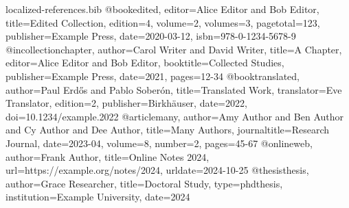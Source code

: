 \begin{filecontents*}{localized-references.bib}
@book{edited,
  editor={Alice Editor and Bob Editor}, title={Edited Collection},
  edition={4}, volume={2}, volumes={3}, pagetotal={123},
  publisher={Example Press}, date={2020-03-12}, isbn={978-0-1234-5678-9}}
@incollection{chapter,
  author={Carol Writer and David Writer}, title={A Chapter},
  editor={Alice Editor and Bob Editor}, booktitle={Collected Studies},
  publisher={Example Press}, date={2021}, pages={12-34}}
@book{translated,
  author={Paul Erd{\H{o}}s and Pablo Soberón}, title={Translated Work},
  translator={Eve Translator}, edition={2}, publisher={Birkhäuser}, date={2022},
  doi={10.1234/example.2022}}
@article{many,
  author={Amy Author and Ben Author and Cy Author and Dee Author},
  title={Many Authors}, journaltitle={Research Journal},
  date={2023-04}, volume={8}, number={2}, pages={45-67}}
@online{web,
  author={Frank Author}, title={Online Notes 2024},
  url={https://example.org/notes/2024}, urldate={2024-10-25}}
@thesis{thesis,
  author={Grace Researcher}, title={Doctoral Study}, type={phdthesis},
  institution={Example University}, date={2024}}
\end{filecontents*}

